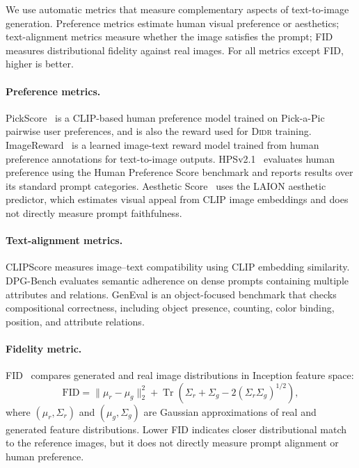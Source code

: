 We use automatic metrics that measure complementary aspects of text-to-image generation. Preference metrics estimate human visual preference or aesthetics; text-alignment metrics measure whether the image satisfies the prompt; FID measures distributional fidelity against real images. For all metrics except FID, higher is better.

\paragraph{Preference metrics.}
PickScore~\citep{pickscore} is a CLIP-based human preference model trained on Pick-a-Pic pairwise user preferences, and is also the reward used for \textsc{Didr} training. ImageReward~\citep{xu2023imagereward} is a learned image-text reward model trained from human preference annotations for text-to-image outputs. HPSv2.1~\citep{hpsv2} evaluates human preference using the Human Preference Score benchmark and reports results over its standard prompt categories. Aesthetic Score~\citep{laionaes} uses the LAION aesthetic predictor, which estimates visual appeal from CLIP image embeddings and does not directly measure prompt faithfulness.

\paragraph{Text-alignment metrics.}
CLIPScore \citep{hessel2021clipscore,radford2021learning} measures image--text compatibility using CLIP embedding similarity. DPG-Bench \citep{dpgbench} evaluates semantic adherence on dense prompts containing multiple attributes and relations. GenEval \citep{geneval} is an object-focused benchmark that checks compositional correctness, including object presence, counting, color binding, position, and attribute relations.

\paragraph{Fidelity metric.}
FID~\citep{heusel2017gans} compares generated and real image distributions in Inception feature space:
\[
\mathrm{FID}
= \|\mu_r-\mu_g\|_2^2
+ \operatorname{Tr}\!\left(\Sigma_r+\Sigma_g-2(\Sigma_r\Sigma_g)^{1/2}\right),
\]
where $(\mu_r,\Sigma_r)$ and $(\mu_g,\Sigma_g)$ are Gaussian approximations of real and generated feature distributions. Lower FID indicates closer distributional match to the reference images, but it does not directly measure prompt alignment or human preference.

